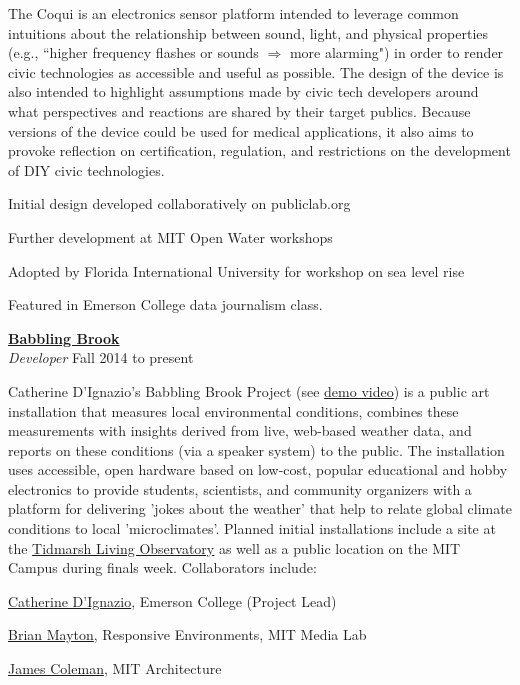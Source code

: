 \documentclass[10pt]{article}
\newcommand{\blankline}{\quad\pagebreak[3]}
\newcommand{\halfblankline}{\quad\vspace{-0.5\baselineskip}\pagebreak[3]}
\begin{document}
The Coqui is an electronics sensor platform intended to leverage common intuitions about the relationship between sound, light, and physical properties (e.g., ``higher frequency flashes or sounds $\Rightarrow$ more alarming") in order to render civic technologies as accessible and useful as possible. The design of the device is also intended to highlight assumptions made by civic tech developers around what perspectives and reactions are shared by their target publics.  Because versions of the device could be used for medical applications, it also aims to provoke reflection on certification, regulation, and restrictions on the development of DIY civic technologies.
    \begin{innerlist}
        \item Initial design developed collaboratively on publiclab.org
\item Further development at MIT Open Water workshops
\item Adopted by Florida International University for workshop on sea level rise
        \item Featured in Emerson College data journalism class.
\end{innerlist}

\blankline


\href{http://www.slideshare.net/CatherineDIgnazio/sensing-nature-the-babbling-brook}{\textbf{Babbling Brook}} \\
\emph{Developer} \hfill {Fall 2014 to present} 

\halfblankline

Catherine D'Ignazio's Babbling Brook Project  (see \href{https://www.youtube.com/watch?v=yP3mvWlxwxE}{demo video}) is a public art installation that measures local environmental conditions, combines these measurements with insights derived from live, web-based weather data, and reports on these conditions (via a speaker system) to the public.  The installation uses accessible, open hardware based on low-cost, popular educational and hobby electronics to provide students, scientists, and community organizers with a platform for delivering 'jokes about the weather' that help to relate global climate conditions to local 'microclimates'. Planned initial installations include a site at the \href{http://tidmarsh.media.mit.edu/}{Tidmarsh Living Observatory} as well as a public location on the MIT Campus during finals week.  Collaborators include: 

\begin{innerlist}
        \item \href{https://civic.mit.edu/users/kanarinka}{Catherine D'Ignazio}, Emerson College (Project Lead)
\item \href{http://bdm.cc/}{Brian Mayton}, Responsive Environments, MIT Media Lab
\item \href{https://www.linkedin.com/pub/james-coleman/9/265/b7b}{James Coleman}, MIT Architecture
\end{innerlist}
\end{document}
